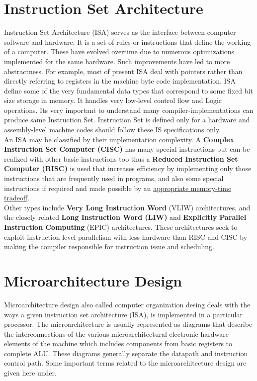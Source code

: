 \section{Instruction Set Architecture}
Instruction Set Architecture (ISA) serves as the interface between computer software and hardware. It is a set of rules or instructions that define the working of a computer. These have evolved overtime due to numerous optimizations implemented for the same hardware. Such improvements have led to more abstractness. For example, most of present ISA deal with pointers rather than directly referring to registers in the machine byte code implementation. ISA define some of the very fundamental data types that correspond to some fixed bit size storage in memory. It handles very low-level control flow and Logic operations. Its very important to understand many compiler-implementations can produce same Instruction Set. Instruction Set is defined only for a hardware and assembly-level machine codes should follow these IS specifications only. \\

An ISA may be classified by their implementation complexity. A \textbf{Complex Instruction Set Computer (CISC)} has many special instructions but can be realized with other basic instructions too thus a \textbf{Reduced Instruction Set Computer (RISC)}\cite{risc_cisc} is used that increases efficiency by implementing only those instructions that are frequently used in programs, and also some special instructions if required and made possible by an \underline{appropriate memory-time tradeoff}.\\ 


Other types include \textbf{Very Long Instruction Word} (VLIW) architectures, and the closely related \textbf{Long Instruction Word (LIW)} and \textbf{Explicitly Parallel Instruction Computing} (EPIC) architectures. These architectures seek to exploit instruction-level parallelism with less hardware than RISC and CISC by making the compiler responsible for instruction issue and scheduling.\\

\section{Microarchitecture Design}

Microarchitecture design also called computer organization desing deals with the ways a given instruction set architecture (ISA), is implemented in a particular processor. The microarchitecture is usually represented as diagrams that describe the interconnections of the various microarchitectural electronic hardware elements of the machine which includes components from basic registers to complete ALU. These diagrams generally separate the datapath and instruction control path. Some important terms related to the microarchitecture design are given here under.\\

